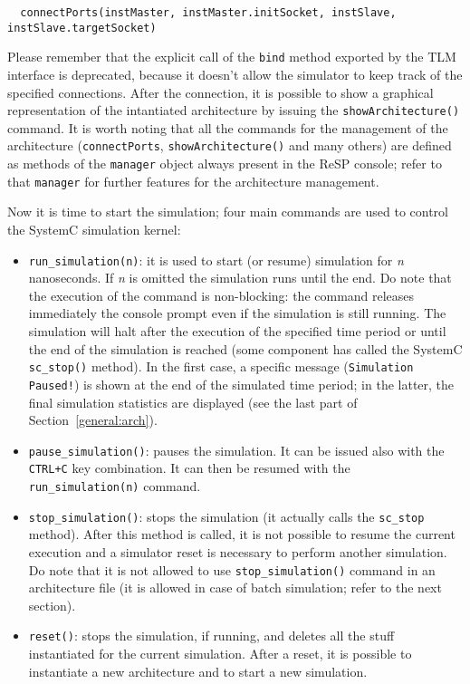\scriptsize
\begin{verbatim}
  connectPorts(instMaster, instMaster.initSocket, instSlave, instSlave.targetSocket)
\end{verbatim}
\normalsize

Please remember that the explicit call of the \texttt{bind} method exported by the TLM interface is deprecated, because it doesn't allow the simulator to keep track of the specified connections. After the connection, it is possible to show a graphical representation of the intantiated architecture by issuing the \texttt{showArchitecture()} command. It is worth noting that all the commands for the management of the architecture (\texttt{connectPorts}, \texttt{showArchitecture()} and many others) are defined as methods of the \texttt{manager} object always present in the ReSP console; refer to that \texttt{manager} for further features for the architecture management.

\indent Now it is time to start the simulation; four main commands are used to control the SystemC simulation kernel:
\begin{itemize}
  \item \texttt{run\_simulation(n)}: it is used to start (or resume) simulation for \emph{n} nanoseconds. If \emph{n} is omitted the simulation runs until the end. Do note that the execution of the command is non-blocking: the command releases immediately the console prompt even if the simulation is still running. The simulation will halt after the execution of the specified time period or until the end of the simulation is reached (some component has called the SystemC \texttt{sc\_stop()} method). In the first case, a specific message (\texttt{Simulation Paused!}) is shown at the end of the simulated time period; in the latter, the final simulation statistics are displayed (see the last part of Section~\ref{general:arch}).
  \item \texttt{pause\_simulation()}: pauses the simulation. It can be issued also with the \texttt{CTRL+C} key combination. It can then be resumed with the \texttt{run\_simulation(n)} command.
  \item \texttt{stop\_simulation()}: stops the simulation (it actually calls the \texttt{sc\_stop} method). After this method is called, it is not possible to resume the current execution and a simulator reset is necessary to perform another simulation. Do note that it is not allowed to use \texttt{stop\_simulation()} command in an architecture file (it is allowed in case of batch simulation; refer to the next section).
  \item \texttt{reset()}: stops the simulation, if running, and deletes all the stuff instantiated for the current simulation. After a reset, it is possible to instantiate a new architecture and to start a new simulation. 
\end{itemize}

